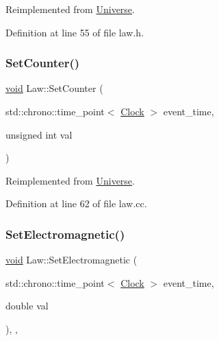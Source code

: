 Reimplemented from \mbox{\hyperlink{class_universe_a3b3da7c86a7b75e5e5c0b7972ac82a87}{Universe}}.



Definition at line 55 of file law.\+h.

\mbox{\label{class_law_a408c401c8a44870c29ba9d08b45cb40f}} 
\subsubsection{\texorpdfstring{Set\+Counter()}{SetCounter()}}
{\footnotesize\ttfamily \mbox{\hyperlink{glad_8h_a950fc91edb4504f62f1c577bf4727c29}{void}} Law\+::\+Set\+Counter (\begin{DoxyParamCaption}\item[{std\+::chrono\+::time\+\_\+point$<$ \mbox{\hyperlink{universe_8h_a0ef8d951d1ca5ab3cfaf7ab4c7a6fd80}{Clock}} $>$}]{event\+\_\+time,  }\item[{unsigned int}]{val }\end{DoxyParamCaption})\hspace{0.3cm}{\ttfamily [virtual]}}



Reimplemented from \mbox{\hyperlink{class_universe_aa22202ae740eb1355529afcb13285e91}{Universe}}.



Definition at line 62 of file law.\+cc.

\mbox{\label{class_law_acabe1a3113c207368f3bb6fe81e13963}} 
\subsubsection{\texorpdfstring{Set\+Electromagnetic()}{SetElectromagnetic()}}
{\footnotesize\ttfamily \mbox{\hyperlink{glad_8h_a950fc91edb4504f62f1c577bf4727c29}{void}} Law\+::\+Set\+Electromagnetic (\begin{DoxyParamCaption}\item[{std\+::chrono\+::time\+\_\+point$<$ \mbox{\hyperlink{universe_8h_a0ef8d951d1ca5ab3cfaf7ab4c7a6fd80}{Clock}} $>$}]{event\+\_\+time,  }\item[{double}]{val }\end{DoxyParamCaption})\hspace{0.3cm}{\ttfamily [inline]}, {\ttfamily [final]}, {\ttfamily [virtual]}}



